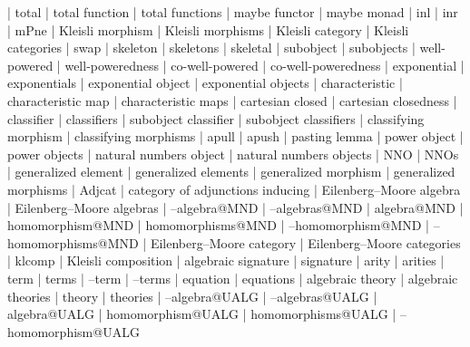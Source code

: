     |   total
    |   total function
    |   total functions
    |   maybe functor
    |   maybe monad
    |   inl
    |   inr
    |   mPne
    |   Kleisli morphism
    |   Kleisli morphisms
    |   Kleisli category
    |   Kleisli categories
    |   swap
    |   skeleton
    |   skeletons
    |   skeletal
    |   subobject
    |   subobjects
    |   well-powered
    |   well-poweredness
    |   co-well-powered
    |   co-well-poweredness
    |   exponential
    |   exponentials
    |   exponential object
    |   exponential objects
    |   characteristic
    |   characteristic map
    |   characteristic maps
    |   cartesian closed
    |   cartesian closedness
    |   classifier
    |   classifiers
    |   subobject classifier
    |   subobject classifiers
    |   classifying morphism
    |   classifying morphisms
    |   apull
    |   apush
    |   pasting lemma
    |   power object
    |   power objects
    |   natural numbers object
    |   natural numbers objects
    |   NNO
    |   NNOs
    |   generalized element
    |   generalized elements
    |   generalized morphism
    |   generalized morphisms
    |   Adjcat
    |   category of adjunctions inducing
    |   Eilenberg--Moore algebra
    |   Eilenberg--Moore algebras
    |   --algebra@MND
    |   --algebras@MND
    |   algebra@MND
    |   homomorphism@MND
    |   homomorphisms@MND
    |   --homomorphism@MND
    |   --homomorphisms@MND
    |   Eilenberg--Moore category
    |   Eilenberg--Moore categories
    |   klcomp
    |   Kleisli composition
    |   algebraic signature
    |   signature
    |   arity
    |   arities
    |   term
    |   terms
    |   --term
    |   --terms
    |   equation
    |   equations
    |   algebraic theory
    |   algebraic theories
    |   theory
    |   theories
    |   --algebra@UALG
    |   --algebras@UALG
    |   algebra@UALG
    |   homomorphism@UALG
    |   homomorphisms@UALG
    |   --homomorphism@UALG

